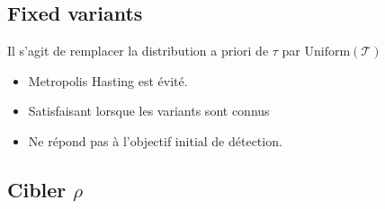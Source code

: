 \documentclass{beamer}
\begin{document}
\subsection{Fixed variants}

\begin{frame}
Il s'agit de remplacer la distribution a priori de $\tau$ par 
$\mathrm{Uniform}(\mathcal{T})$
\begin{itemize}
\item Metropolis Hasting est évité.
\item Satisfaisant lorsque les variants sont connus
\item Ne répond pas à l'objectif initial de détection.
\end{itemize}
\end{frame}
\subsection{Cibler $\rho$}
\end{document}
